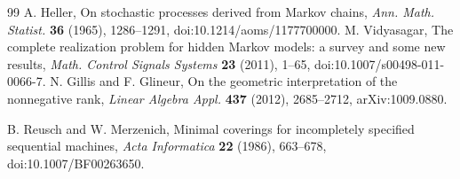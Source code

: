 \documentclass[11pt]{amsart}
\theoremstyle{definition}\newtheorem{definition}[theorem]{Definition}
\theoremstyle{remark}\newtheorem{remark}[theorem]{Remark}
\newcommand{\1}{\mathbf 1}
\begin{document}
\begin{thebibliography}{99}
 A. Heller, On stochastic processes derived from Markov chains,
\emph{Ann. Math. Statist.} \textbf{36} (1965), 1286--1291,
doi:10.1214/aoms/1177700000.
 M. Vidyasagar, The complete realization problem for
hidden Markov models: a survey and some new results,
\emph{Math. Control Signals Systems} \textbf{23} (2011), 1--65,
doi:10.1007/s00498-011-0066-7.
 N. Gillis and F. Glineur, On the geometric interpretation of
the nonnegative rank, \emph{Linear Algebra Appl.} \textbf{437} (2012),
2685--2712, arXiv:1009.0880.

 B. Reusch and W. Merzenich, Minimal coverings for
incompletely specified sequential machines, \emph{Acta Informatica}
\textbf{22} (1986), 663--678, doi:10.1007/BF00263650.
\end{thebibliography}
\end{document}
